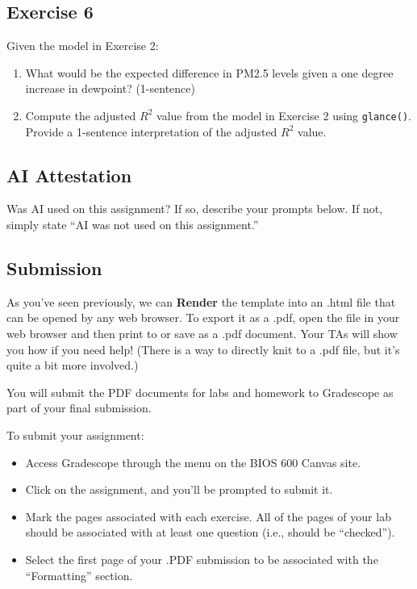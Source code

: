 \documentclass[
  letterpaper,
  DIV=11,
  numbers=noendperiod]{scrartcl}
\begin{document}
\subsection{Exercise 6}\label{exercise-6}

Given the model in Exercise 2:

\begin{enumerate}
\def\labelenumi{\alph{enumi}.}
\item
  What would be the expected difference in PM2.5 levels given a one
  degree increase in dewpoint? (1-sentence)
\item
  Compute the adjusted \(R^2\) value from the model in Exercise 2 using
  \texttt{glance()}. Provide a 1-sentence interpretation of the adjusted
  \(R^2\) value.
\end{enumerate}

\subsection{AI Attestation}\label{ai-attestation}

Was AI used on this assignment? If so, describe your prompts below. If
not, simply state ``AI was not used on this assignment.''

\subsection{Submission}\label{submission}

As you've seen previously, we can \textbf{Render} the template into an
.html file that can be opened by any web browser. To export it as a
.pdf, open the file in your web browser and then print to or save as a
.pdf document. Your TAs will show you how if you need help! (There is a
way to directly knit to a .pdf file, but it's quite a bit more
involved.)

You will submit the PDF documents for labs and homework to Gradescope as
part of your final submission.

To submit your assignment:

\begin{itemize}
\item
  Access Gradescope through the menu on the BIOS 600 Canvas site.
\item
  Click on the assignment, and you'll be prompted to submit it.
\item
  Mark the pages associated with each exercise. All of the pages of your
  lab should be associated with at least one question (i.e., should be
  ``checked'').
\item
  Select the first page of your .PDF submission to be associated with
  the ``Formatting'' section.
\end{itemize}
\end{document}
